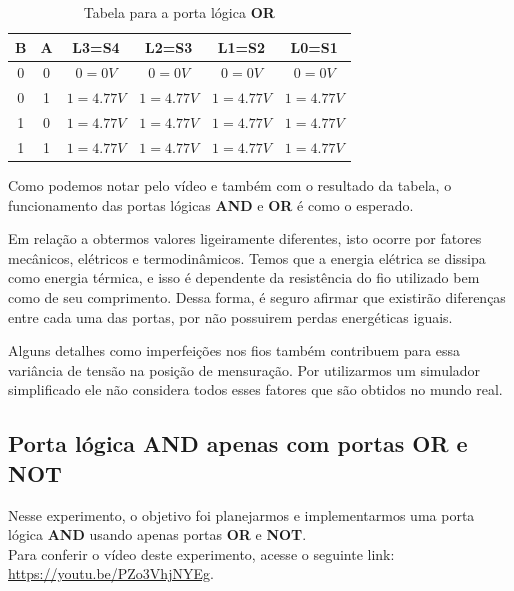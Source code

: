 \documentclass[12pt]{article}
\begin{document}
\begin{table}[H]
    \centering
    \caption{Tabela para a porta lógica \textbf{OR}}
    \begin{tabular}{|c|c|c|c|c|c|}
    \hline
    \textbf{B} & \textbf{A} & \textbf{L3}=S4 & \textbf{L2}=S3 & \textbf{L1}=S2 & \textbf{L0}=S1 \\
    \hline
    0  & 0 & \(0 = 0V\) & \(0 = 0V\) & \(0 = 0V\) & \(0 = 0V\) \\
    \hline
    0  & 1 & \(1 = 4.77V\) & \(1 = 4.77V\) & \(1 = 4.77V\) & \(1 = 4.77V\) \\
    \hline
    1  & 0 & \(1 = 4.77V\) & \(1 = 4.77V\) & \(1 = 4.77V\) & \(1 = 4.77V\) \\
    \hline
    1  & 1 & \(1 = 4.77V\) & \(1 = 4.77V\) & \(1 = 4.77V\) & \(1 = 4.77V\) \\
    \hline
    \end{tabular}
    \label{tab:tabela_or}
\end{table}

Como podemos notar pelo vídeo e também com o resultado da tabela, o
funcionamento das portas lógicas \textbf{AND} e \textbf{OR} é como o esperado.

Em relação a obtermos valores ligeiramente diferentes, isto ocorre por fatores mecânicos, elétricos e termodinâmicos. Temos que a energia elétrica se dissipa como energia térmica, e isso é dependente da resistência do fio utilizado bem como de seu comprimento. Dessa forma, é seguro afirmar que existirão diferenças entre cada uma das portas, por não possuirem perdas energéticas iguais.

Alguns detalhes como imperfeições nos fios também contribuem para essa variância de tensão na posição de mensuração. Por utilizarmos um simulador simplificado
ele não considera todos esses fatores que são obtidos no mundo real.\\[2em]

\subsection{Porta lógica \textbf{AND} apenas com portas \textbf{OR} e \textbf{NOT}}
\label{sec:and_with_only_or_and_not}

Nesse experimento, o objetivo foi planejarmos e implementarmos uma porta lógica
\textbf{AND} usando apenas portas \textbf{OR} e \textbf{NOT}.\\
Para conferir o vídeo deste experimento, acesse o seguinte link:
\href{https://youtu.be/PZo3VhjNYEg}{https://youtu.be/PZo3VhjNYEg}.
\end{document}
